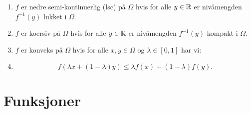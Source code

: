\documentclass[11pt, a4paper]{article}
\begin{document}
\begin{enumerate}
    \item $f$ er nedre semi-kontinuerlig (lsc) på $\Omega$ hvis for alle $y \in \mathbb{R}$ er nivåmengden $f^{-1}(y)$ lukket i $\Omega$.
    \item $f$ er koersiv på $\Omega$ hvis for alle $y \in \mathbb{R}$ er nivåmengden $f^{-1}(y)$ kompakt i $\Omega$.
    \item $f$ er konveks på $\Omega$ hvis for alle $x, y \in \Omega$ og $\lambda \in [0, 1]$ har vi:
    \item
          \[
              f(\lambda x + (1 - \lambda)y) \leq \lambda f(x) + (1 - \lambda)f(y).
          \]
\end{enumerate}

\newpage
\section{Funksjoner}
\end{document}
